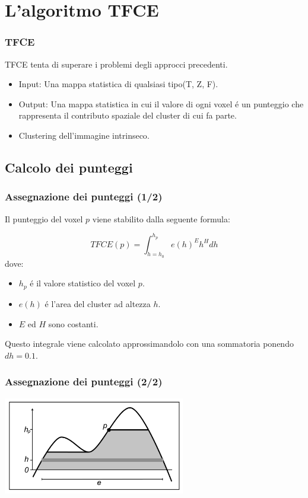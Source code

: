 \documentclass{beamer}
\begin{document}
\section{L'algoritmo TFCE}
\begin{frame}
\frametitle{TFCE}
TFCE tenta di superare i problemi degli approcci precedenti.
\begin{itemize}
\item Input: Una mappa statistica di qualsiasi tipo(T, Z, F).
\item Output: Una mappa statistica in cui il valore di ogni voxel \'e un \alert{punteggio} che rappresenta il contributo spaziale del cluster di cui fa parte.
\end{itemize}
\bigskip
\begin{itemize}
\item Clustering dell'immagine \alert{intrinseco}.
\end{itemize}
\end{frame}

\subsection{Calcolo dei punteggi}

\begin{frame}
\frametitle{Assegnazione dei punteggi (1/2)}
Il punteggio del voxel $p$ viene stabilito dalla seguente formula:

$$TFCE(p)=\int_{h=h_0}^{h_p}e(h)^E h^H dh$$
dove:
\begin{itemize}
\item $h_p$ \'e il \alert{valore statistico} del voxel $p$.
\item $e(h)$ \'e l'\alert{area del cluster} ad altezza $h$.
\item $E$ ed $H$ sono costanti.
\end{itemize}
\vfill
Questo integrale viene calcolato approssimandolo con una sommatoria ponendo $dh = 0.1$.

\end{frame}

\begin{frame}
\frametitle{Assegnazione dei punteggi (2/2)}
\includegraphics[width=300px]{Images/TFCE.png}
\end{frame}
\end{document}
